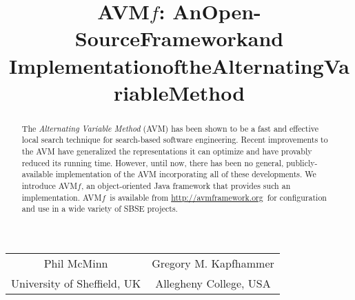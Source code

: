\documentclass{llncs}
\newcommand{\AVM}{Alternating Variable Method\xspace}
\newcommand{\name}{\mbox{AVM\hspace{-1pt}$f$}\xspace}
\newcommand{\repourl}{\url{http://avmframework.org}\xspace}
\begin{document}
\title{\texorpdfstring{\name: An\:Open-Source\:Framework\:and\\$\!$$\!$$\!$Implementation\:of\:the\:Alternating\:Variable\:Method\vspace{-.75em}}{}}
\author{} %
\institute{} %
\maketitle

\vspace{-2em}
\begin{center}
\begin{tabular}{c@{\hskip 3em}c}
				Phil McMinn & Gregory M. Kapfhammer \\
				{\small University of Sheffield, UK} & {\small Allegheny College, USA} \\
\end{tabular}
\end{center}
\vspace{-2em}


\begin{abstract}
The {\it \AVM\/} (AVM) has been shown to be a fast and effective local search technique for %
search-based software engineering.
%
Recent improvements to the AVM have generalized the
representations it can optimize and have provably reduced its running time.
However, until now, there has been no general, publicly-available
implementation of the AVM
incorporating
all of these developments.
We introduce \name, an object-oriented
Java framework
that provides
such an implementation. \name~is available from \repourl~for configuration and use in a wide variety of SBSE projects.\vspace{-1ex}
\end{abstract}

\vspace{-2.5em}
\end{document}
